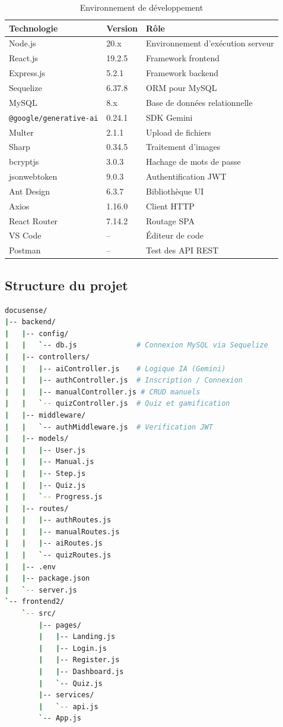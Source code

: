 \documentclass[12pt, a4paper, twoside, openany]{report}
\begin{document}
\begin{table}[H]
  \centering
  \caption{Environnement de d\'eveloppement}
  \label{tab:env}
  \begin{tabularx}{\textwidth}{l l X}
    \toprule
    \textbf{Technologie} & \textbf{Version} & \textbf{R\^ole} \\
    \midrule
    Node.js          & 20.x     & Environnement d'ex\'ecution serveur \\
    React.js         & 19.2.5   & Framework frontend \\
    Express.js       & 5.2.1    & Framework backend \\
    Sequelize        & 6.37.8   & ORM pour MySQL \\
    MySQL            & 8.x      & Base de donn\'ees relationnelle \\
    \texttt{@google/generative-ai} & 0.24.1 & SDK Gemini \\
    Multer           & 2.1.1    & Upload de fichiers \\
    Sharp            & 0.34.5   & Traitement d'images \\
    bcryptjs         & 3.0.3    & Hachage de mots de passe \\
    jsonwebtoken     & 9.0.3    & Authentification JWT \\
    Ant Design       & 6.3.7    & Biblioth\`eque UI \\
    Axios            & 1.16.0   & Client HTTP \\
    React Router     & 7.14.2   & Routage SPA \\
    VS Code          & --       & \'Editeur de code \\
    Postman          & --       & Test des API REST \\
    \bottomrule
  \end{tabularx}
\end{table}

\subsection{Structure du projet}

\begin{lstlisting}[language=bash, caption={Arborescence du projet DocuSense}]
docusense/
|-- backend/
|   |-- config/
|   |   `-- db.js              # Connexion MySQL via Sequelize
|   |-- controllers/
|   |   |-- aiController.js    # Logique IA (Gemini)
|   |   |-- authController.js  # Inscription / Connexion
|   |   |-- manualController.js # CRUD manuels
|   |   `-- quizController.js  # Quiz et gamification
|   |-- middleware/
|   |   `-- authMiddleware.js  # Verification JWT
|   |-- models/
|   |   |-- User.js
|   |   |-- Manual.js
|   |   |-- Step.js
|   |   |-- Quiz.js
|   |   `-- Progress.js
|   |-- routes/
|   |   |-- authRoutes.js
|   |   |-- manualRoutes.js
|   |   |-- aiRoutes.js
|   |   `-- quizRoutes.js
|   |-- .env
|   |-- package.json
|   `-- server.js
`-- frontend2/
    `-- src/
        |-- pages/
        |   |-- Landing.js
        |   |-- Login.js
        |   |-- Register.js
        |   |-- Dashboard.js
        |   `-- Quiz.js
        |-- services/
        |   `-- api.js
        `-- App.js
\end{lstlisting}
\end{document}
